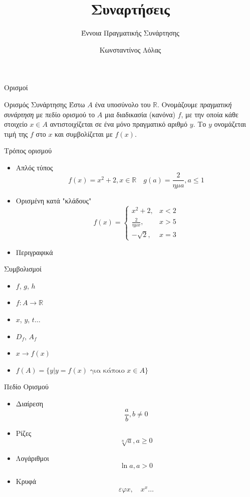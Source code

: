 \documentclass{presentation}
\title{Συναρτήσεις}
\subtitle{Έννοια Πραγματικής Συνάρτησης}
\author[Λόλας]{Κωνσταντίνος Λόλας }
\begin{document}
\begin{frame}
  \titlepage
\end{frame}
\begin{frame}{Ορισμοί}
  \begin{block}{Ορισμός Συνάρτησης}
    Έστω $Α$ ένα υποσύνολο του $\mathbb{R}$. Ονομάζουμε \emph{πραγματική συνάρτηση} με πεδίο ορισμού το $Α$ μια διαδικασία (κανόνα) $f$, με την οποία κάθε στοιχείο $x\in A$ αντιστοιχίζεται σε ένα μόνο πραγματικό αριθμό $y$. Το $y$ ονομάζεται τιμή της $f$ στο $x$ και συμβολίζεται με $f(x)$.
  \end{block}
\end{frame}

\begin{frame}{Τρόπος ορισμού}
  \begin{itemize}
    \item<1-> Απλός τύπος
          $$f(x)=x^2+2,x\in\mathbb{R}\quad g(a)=\frac{2}{ημa}, a\le1$$
    \item<2-> Ορισμένη κατά "κλάδους"
          $$
            f(x)=
            \begin{cases}
              x^2+2,         & x<2 \\
              \frac{2}{ημx}, & x>5 \\
              -\sqrt{2},     & x=3
            \end{cases}
          $$
    \item<3-> Περιγραφικά
  \end{itemize}
\end{frame}

\begin{frame}{Συμβολισμοί}
  \begin{itemize}
    \item $f$, $g$, $h$
    \item $f:A\to\mathbb{R}$
    \item $x$, $y$, $t\ldots$
    \item $D_f$, $A_f$
    \item $x\to f(x)$
    \item $f(A)=\{y| y=f(x)\text{ για κάποιο }x\in A\}$
  \end{itemize}
\end{frame}

\begin{frame}{Πεδίο Ορισμού}
  \begin{itemize}
    \item<1-> Διαίρεση
          $$\frac{a}{b},b\ne 0$$
    \item<2-> Ρίζες
          $$\sqrt[n]{a},a\ge 0$$
    \item<3-> Λογάριθμοι
          $$\ln a,a > 0$$
    \item<4-> Κρυφά
          $$εφx,\quad x^x\ldots$$
  \end{itemize}
\end{frame}
\end{document}
